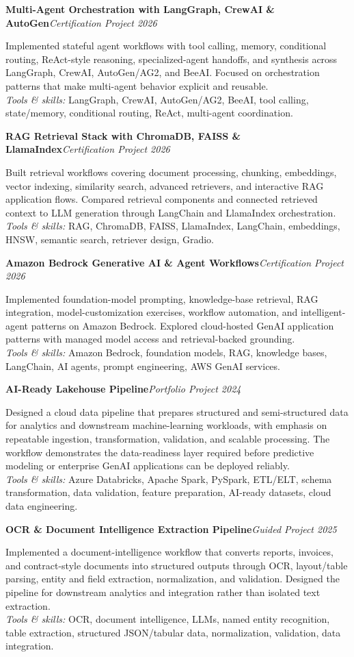 \documentclass[9pt,letterpaper]{extarticle}
\newcommand{\project}[3]{\Needspace{5\baselineskip}\textbf{#1}\hfill\textit{#2 \textbar{} #3}\par}
\begin{document}
\project{Multi-Agent Orchestration with LangGraph, CrewAI \& AutoGen}{Certification Project}{2026}
Implemented stateful agent workflows with tool calling, memory, conditional routing, ReAct-style reasoning, specialized-agent handoffs, and synthesis across LangGraph, CrewAI, AutoGen/AG2, and BeeAI. Focused on orchestration patterns that make multi-agent behavior explicit and reusable.\\[-1pt]
{\small\textit{Tools \& skills:} LangGraph, CrewAI, AutoGen/AG2, BeeAI, tool calling, state/memory, conditional routing, ReAct, multi-agent coordination.}

\project{RAG Retrieval Stack with ChromaDB, FAISS \& LlamaIndex}{Certification Project}{2026}
Built retrieval workflows covering document processing, chunking, embeddings, vector indexing, similarity search, advanced retrievers, and interactive RAG application flows. Compared retrieval components and connected retrieved context to LLM generation through LangChain and LlamaIndex orchestration.\\[-1pt]
{\small\textit{Tools \& skills:} RAG, ChromaDB, FAISS, LlamaIndex, LangChain, embeddings, HNSW, semantic search, retriever design, Gradio.}

\project{Amazon Bedrock Generative AI \& Agent Workflows}{Certification Project}{2026}
Implemented foundation-model prompting, knowledge-base retrieval, RAG integration, model-customization exercises, workflow automation, and intelligent-agent patterns on Amazon Bedrock. Explored cloud-hosted GenAI application patterns with managed model access and retrieval-backed grounding.\\[-1pt]
{\small\textit{Tools \& skills:} Amazon Bedrock, foundation models, RAG, knowledge bases, LangChain, AI agents, prompt engineering, AWS GenAI services.}


\project{AI-Ready Lakehouse Pipeline}{Portfolio Project}{2024}
Designed a cloud data pipeline that prepares structured and semi-structured data for analytics and downstream machine-learning workloads, with emphasis on repeatable ingestion, transformation, validation, and scalable processing. The workflow demonstrates the data-readiness layer required before predictive modeling or enterprise GenAI applications can be deployed reliably.\\[-1pt]
{\small\textit{Tools \& skills:} Azure Databricks, Apache Spark, PySpark, ETL/ELT, schema transformation, data validation, feature preparation, AI-ready datasets, cloud data engineering.}

\project{OCR \& Document Intelligence Extraction Pipeline}{Guided Project}{2025}
Implemented a document-intelligence workflow that converts reports, invoices, and contract-style documents into structured outputs through OCR, layout/table parsing, entity and field extraction, normalization, and validation. Designed the pipeline for downstream analytics and integration rather than isolated text extraction.\\[-1pt]
{\small\textit{Tools \& skills:} OCR, document intelligence, LLMs, named entity recognition, table extraction, structured JSON/tabular data, normalization, validation, data integration.}
\end{document}
